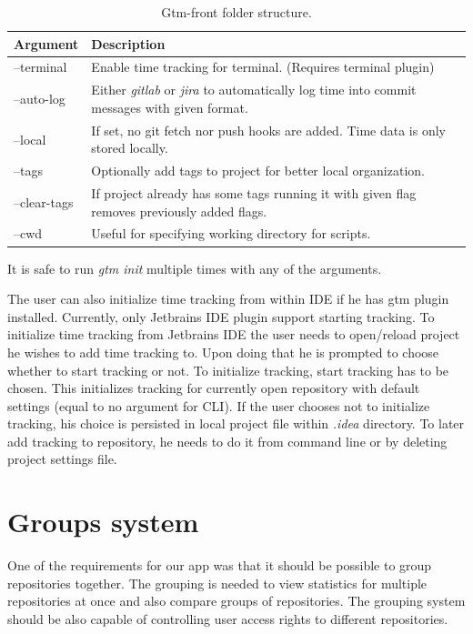 \begin{table}[h]
    \centering
    \begin{tabular}{ | p{3cm} | p{10cm} |}
        \hline
        Argument & Description\\
        \hline
        --terminal & Enable time tracking for terminal. (Requires terminal plugin)\\
        \hline
        --auto-log & Either \textit{gitlab} or \textit{jira} to automatically log time
        into commit messages with given format.\\
        \hline
        --local & If set, no git fetch nor push hooks are added.
        Time data is only stored locally.\\
        \hline
        --tags & Optionally add tags to project for better local organization.\\
        \hline
        --clear-tags & If project already has some tags running it with given flag removes previously added flags.\\
        \hline
        --cwd & Useful for specifying working directory for scripts.\\
        \hline
    \end{tabular}
    \caption{Gtm-front folder structure.}
    \label{tab:gtm-init}
\end{table}
It is safe to run \textit{gtm init} multiple times with any of the arguments.

The user can also initialize time tracking from within IDE if he has gtm plugin installed.
Currently, only Jetbrains IDE plugin support starting tracking.
To initialize time tracking from Jetbrains IDE the user needs to open/reload project he wishes to add time tracking to.
Upon doing that he is prompted to choose whether to start tracking or not.
To initialize tracking, start tracking has to be chosen.
This initializes tracking for currently open repository with default settings (equal to no argument for CLI).
If the user chooses not to initialize tracking, his choice is persisted in local project file within \textit{.idea} directory.
To later add tracking to repository, he needs to do it from command line or by deleting project settings file.


\section{Groups system}\label{sec:group-system}
One of the requirements for our app was that it should be possible to group repositories together.
The grouping is needed to view statistics for multiple repositories at once and also compare groups of repositories.
The grouping system should be also capable of controlling user access rights to different repositories.

